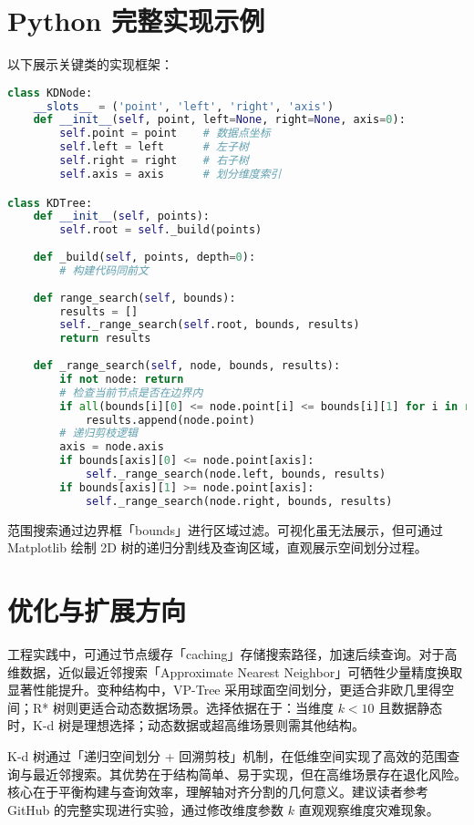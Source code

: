 \chapter{Python 完整实现示例}
以下展示关键类的实现框架：\par
\begin{lstlisting}[language=python]
class KDNode:
    __slots__ = ('point', 'left', 'right', 'axis')
    def __init__(self, point, left=None, right=None, axis=0):
        self.point = point    # 数据点坐标
        self.left = left      # 左子树
        self.right = right    # 右子树
        self.axis = axis      # 划分维度索引

class KDTree:
    def __init__(self, points):
        self.root = self._build(points)
    
    def _build(self, points, depth=0):
        # 构建代码同前文
    
    def range_search(self, bounds):
        results = []
        self._range_search(self.root, bounds, results)
        return results
        
    def _range_search(self, node, bounds, results):
        if not node: return
        # 检查当前节点是否在边界内
        if all(bounds[i][0] <= node.point[i] <= bounds[i][1] for i in range(len(bounds))):
            results.append(node.point)
        # 递归剪枝逻辑
        axis = node.axis
        if bounds[axis][0] <= node.point[axis]:
            self._range_search(node.left, bounds, results)
        if bounds[axis][1] >= node.point[axis]:
            self._range_search(node.right, bounds, results)
\end{lstlisting}
范围搜索通过边界框「bounds」进行区域过滤。可视化虽无法展示，但可通过 Matplotlib 绘制 2D 树的递归分割线及查询区域，直观展示空间划分过程。\par
\chapter{优化与扩展方向}
工程实践中，可通过节点缓存「caching」存储搜索路径，加速后续查询。对于高维数据，近似最近邻搜索「Approximate Nearest Neighbor」可牺牲少量精度换取显著性能提升。变种结构中，VP-Tree 采用球面空间划分，更适合非欧几里得空间；R* 树则更适合动态数据场景。选择依据在于：当维度 $k < 10$ 且数据静态时，K-d 树是理想选择；动态数据或超高维场景则需其他结构。\par
K-d 树通过「递归空间划分 + 回溯剪枝」机制，在低维空间实现了高效的范围查询与最近邻搜索。其优势在于结构简单、易于实现，但在高维场景存在退化风险。核心在于平衡构建与查询效率，理解轴对齐分割的几何意义。建议读者参考 GitHub 的完整实现进行实验，通过修改维度参数 $k$ 直观观察维度灾难现象。\par
